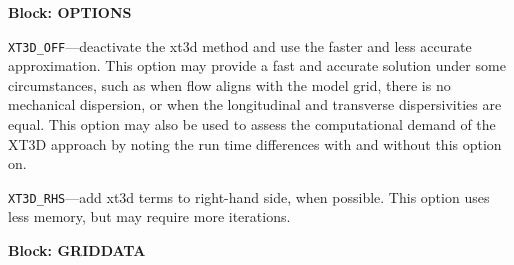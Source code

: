 
\item \textbf{Block: OPTIONS}

\begin{description}
\item \texttt{XT3D\_OFF}---deactivate the xt3d method and use the faster and less accurate approximation.  This option may provide a fast and accurate solution under some circumstances, such as when flow aligns with the model grid, there is no mechanical dispersion, or when the longitudinal and transverse dispersivities are equal.  This option may also be used to assess the computational demand of the XT3D approach by noting the run time differences with and without this option on.

\item \texttt{XT3D\_RHS}---add xt3d terms to right-hand side, when possible.  This option uses less memory, but may require more iterations.

\end{description}
\item \textbf{Block: GRIDDATA}

